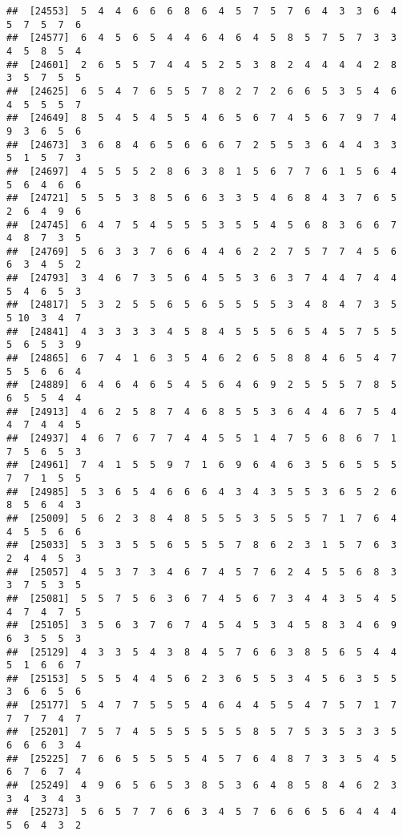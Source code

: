 \documentclass[
]{book}
\begin{document}
\begin{verbatim}
##  [24553]  5  4  4  6  6  6  8  6  4  5  7  5  7  6  4  3  3  6  4  5  7  5  7  6
##  [24577]  6  4  5  6  5  4  4  6  4  6  4  5  8  5  7  5  7  3  3  4  5  8  5  4
##  [24601]  2  6  5  5  7  4  4  5  2  5  3  8  2  4  4  4  4  2  8  3  5  7  5  5
##  [24625]  6  5  4  7  6  5  5  7  8  2  7  2  6  6  5  3  5  4  6  4  5  5  5  7
##  [24649]  8  5  4  5  4  5  5  4  6  5  6  7  4  5  6  7  9  7  4  9  3  6  5  6
##  [24673]  3  6  8  4  6  5  6  6  6  7  2  5  5  3  6  4  4  3  3  5  1  5  7  3
##  [24697]  4  5  5  5  2  8  6  3  8  1  5  6  7  7  6  1  5  6  4  5  6  4  6  6
##  [24721]  5  5  5  3  8  5  6  6  3  3  5  4  6  8  4  3  7  6  5  2  6  4  9  6
##  [24745]  6  4  7  5  4  5  5  5  3  5  5  4  5  6  8  3  6  6  7  4  8  7  3  5
##  [24769]  5  6  3  3  7  6  6  4  4  6  2  2  7  5  7  7  4  5  6  6  3  4  5  2
##  [24793]  3  4  6  7  3  5  6  4  5  5  3  6  3  7  4  4  7  4  4  5  4  6  5  3
##  [24817]  5  3  2  5  5  6  5  6  5  5  5  5  3  4  8  4  7  3  5  5 10  3  4  7
##  [24841]  4  3  3  3  3  4  5  8  4  5  5  5  6  5  4  5  7  5  5  5  6  5  3  9
##  [24865]  6  7  4  1  6  3  5  4  6  2  6  5  8  8  4  6  5  4  7  5  5  6  6  4
##  [24889]  6  4  6  4  6  5  4  5  6  4  6  9  2  5  5  5  7  8  5  6  5  5  4  4
##  [24913]  4  6  2  5  8  7  4  6  8  5  5  3  6  4  4  6  7  5  4  4  7  4  4  5
##  [24937]  4  6  7  6  7  7  4  4  5  5  1  4  7  5  6  8  6  7  1  7  5  6  5  3
##  [24961]  7  4  1  5  5  9  7  1  6  9  6  4  6  3  5  6  5  5  5  7  7  1  5  5
##  [24985]  5  3  6  5  4  6  6  6  4  3  4  3  5  5  3  6  5  2  6  8  5  6  4  3
##  [25009]  5  6  2  3  8  4  8  5  5  5  3  5  5  5  7  1  7  6  4  4  5  5  6  6
##  [25033]  5  3  3  5  5  6  5  5  5  7  8  6  2  3  1  5  7  6  3  2  4  4  5  3
##  [25057]  4  5  3  7  3  4  6  7  4  5  7  6  2  4  5  5  6  8  3  3  7  5  3  5
##  [25081]  5  5  7  5  6  3  6  7  4  5  6  7  3  4  4  3  5  4  5  4  7  4  7  5
##  [25105]  3  5  6  3  7  6  7  4  5  4  5  3  4  5  8  3  4  6  9  6  3  5  5  3
##  [25129]  4  3  3  5  4  3  8  4  5  7  6  6  3  8  5  6  5  4  4  5  1  6  6  7
##  [25153]  5  5  5  4  4  5  6  2  3  6  5  5  3  4  5  6  3  5  5  3  6  6  5  6
##  [25177]  5  4  7  7  5  5  5  4  6  4  4  5  5  4  7  5  7  1  7  7  7  7  4  7
##  [25201]  7  5  7  4  5  5  5  5  5  5  8  5  7  5  3  5  3  3  5  6  6  6  3  4
##  [25225]  7  6  6  5  5  5  5  4  5  7  6  4  8  7  3  3  5  4  5  6  7  6  7  4
##  [25249]  4  9  6  5  6  5  3  8  5  3  6  4  8  5  8  4  6  2  3  3  4  3  4  3
##  [25273]  5  6  5  7  7  6  6  3  4  5  7  6  6  6  5  6  4  4  4  5  6  4  3  2

\end{verbatim}
\end{document}
